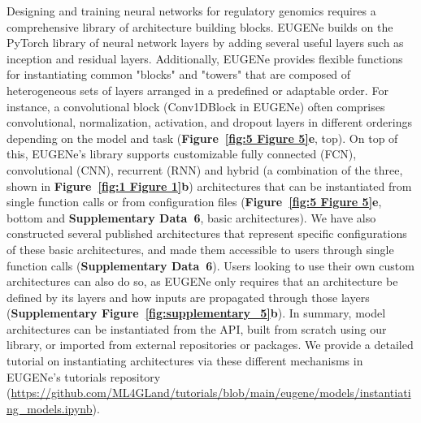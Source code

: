 Designing and training neural networks for regulatory genomics requires a comprehensive library of architecture building blocks. EUGENe builds on the PyTorch library of neural network layers by adding several useful layers such as inception and residual layers. Additionally, EUGENe provides flexible functions for instantiating common "blocks" and "towers" that are composed of heterogeneous sets of layers arranged in a predefined or adaptable order. For instance, a convolutional block (Conv1DBlock in EUGENe) often comprises convolutional, normalization, activation, and dropout layers in different orderings depending on the model and task (\textbf{Figure~\ref{fig:5 Figure 5}\textbf{e}}, top). On top of this, EUGENe’s library supports customizable fully connected (FCN), convolutional (CNN), recurrent (RNN) and hybrid (a combination of the three, shown in \textbf{Figure~\ref{fig:1 Figure 1}\textbf{b}}) architectures that can be instantiated from single function calls or from configuration files (\textbf{Figure~\ref{fig:5 Figure 5}\textbf{e}}, bottom and \textbf{Supplementary Data~6}, basic architectures). We have also constructed several published architectures that represent specific configurations of these basic architectures, and made them accessible to users through single function calls (\textbf{Supplementary Data~6}). Users looking to use their own custom architectures can also do so, as EUGENe only requires that an architecture be defined by its layers and how inputs are propagated through those layers (\textbf{Supplementary Figure~\ref{fig:supplementary_5}\textbf{b}}). In summary, model architectures can be instantiated from the API, built from scratch using our library, or imported from external repositories or packages. We provide a detailed tutorial on instantiating architectures via these different mechanisms in EUGENe’s tutorials repository (\url{https://github.com/ML4GLand/tutorials/blob/main/eugene/models/instantiating_models.ipynb}).

